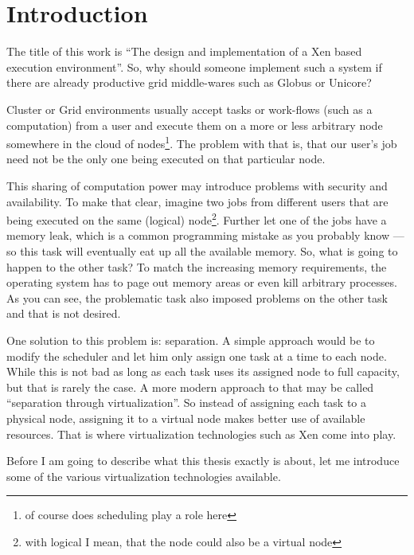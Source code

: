 
\chapter{Introduction}
\label{cha:intro}

The  title  of  this  work   is  ``The  design  and  implementation  of  a
Xen  based  execution  environment''.  So, why  should  someone
implement such a system if  there are already productive grid middle-wares
such as Globus or Unicore?

Cluster or Grid environments usually accept tasks or work-flows (such as a
computation) from a user and execute them on a more or less arbitrary node
somewhere in the cloud of  nodes\footnote{of course does scheduling play a
  role here}.  The  problem with that is, that our user's  job need not be
the only one being executed on that particular node.

This sharing of computation power may introduce problems with security and
availability. To  make that clear,  imagine two jobs from  different users
that are being executed on the same (logical) node\footnote{with logical I
  mean, that  the node could also be  a virtual node}. Further  let one of
the jobs have a memory leak,  which is a common programming mistake as you
probably know  --- so this task  will eventually eat up  all the available
memory.  So,  what is  going to happen  to the  other task?  To  match the
increasing  memory requirements,  the  operating system  has  to page  out
memory  areas or  even  kill arbitrary  processes.   As you  can see,  the
problematic task also  imposed problems on the other task  and that is not
desired.

One solution to this problem is: separation. A simple approach would be to
modify the scheduler  and let him only  assign one task at a  time to each
node. While this is not bad as long as each task uses its assigned node to
full capacity, but that is rarely the case. A more modern approach to that
may  be  called  ``separation  through virtualization''.   So  instead  of
assigning each  task to a  physical node, assigning  it to a  virtual node
makes  better use  of available  resources. That  is  where virtualization
technologies such as Xen come into play.

Before I  am going to describe what  this thesis exactly is  about, let me
introduce some of the various virtualization technologies available.

